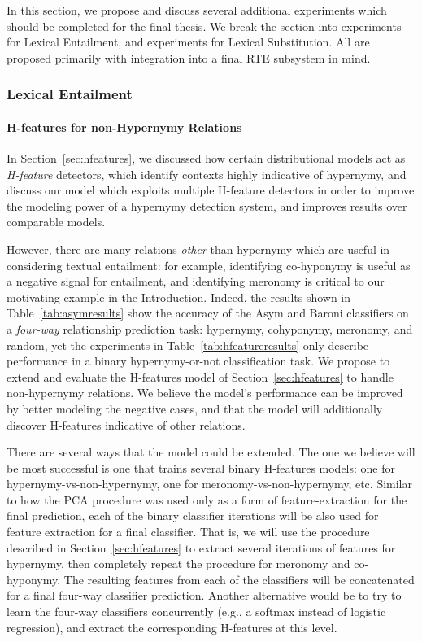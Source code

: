 \documentclass[12pt]{article}
\begin{document}
In this section, we propose and discuss several additional experiments which
should be completed for the final thesis. We break the section into experiments
for Lexical Entailment, and experiments for Lexical Substitution. All are
proposed primarily with integration into a final RTE subsystem in mind.

\subsubsection{Lexical Entailment}

\paragraph{H-features for non-Hypernymy Relations}

In Section~\ref{sec:hfeatures}, we discussed how certain distributional models
act as {\em H-feature} detectors, which identify contexts highly indicative
of hypernymy, and discuss our model which exploits
multiple H-feature detectors in order to improve the
modeling power of a hypernymy detection system, and improves results over
comparable models.

However, there are many relations {\em other} than hypernymy which are useful
in considering textual entailment: for example, identifying co-hyponymy is
useful as a negative signal for entailment, and identifying meronomy is
critical to our motivating example in the Introduction.
Indeed, the results shown in Table~\ref{tab:asymresults} show
the accuracy of the Asym and Baroni classifiers on a {\em four-way} relationship
prediction task: hypernymy, cohyponymy, meronomy, and random, yet the
experiments in Table~\ref{tab:hfeatureresults} only describe performance in a
binary hypernymy-or-not classification task. We propose to extend and evaluate
the H-features model of Section~\ref{sec:hfeatures} to handle non-hypernymy
relations. We believe the model's performance can be improved by
better modeling the negative cases, and that the model will additionally
discover H-features indicative of other relations.

There are several ways that the model could be extended. The one we believe
will be most successful is one that trains several binary H-features models:
one for hypernymy-vs-non-hypernymy, one for meronomy-vs-non-hypernymy, etc.
Similar to how the PCA procedure was used only as a form of feature-extraction
for the final prediction, each of the binary classifier iterations will be also
used for feature extraction for a final classifier.
That is, we will use the procedure described in Section~\ref{sec:hfeatures}
to extract several iterations of features for hypernymy, then completely repeat
the procedure for meronomy and co-hyponymy. The resulting features from each
of the classifiers will be concatenated for a final four-way classifier prediction.
Another alternative would be to try to learn the four-way classifiers concurrently
(e.g., a softmax instead of logistic regression), and extract the corresponding
H-features at this level.
\end{document}
